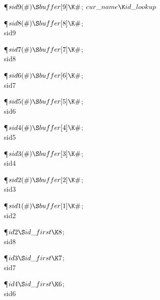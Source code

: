 \Y\P\D {}$\\{sid9}(\#)\S\\{buffer}[9]\K\#$;\5
$\\{cur\_name}\K\\{id\_lookup}$\par
\P\D {}$\\{sid8}(\#)\S\\{buffer}[8]\K\#$;\5
\\{sid9}\par
\P\D {}$\\{sid7}(\#)\S\\{buffer}[7]\K\#$;\5
\\{sid8}\par
\P\D {}$\\{sid6}(\#)\S\\{buffer}[6]\K\#$;\5
\\{sid7}\par
\P\D {}$\\{sid5}(\#)\S\\{buffer}[5]\K\#$;\5
\\{sid6}\par
\P\D {}$\\{sid4}(\#)\S\\{buffer}[4]\K\#$;\5
\\{sid5}\par
\P\D {}$\\{sid3}(\#)\S\\{buffer}[3]\K\#$;\5
\\{sid4}\par
\P\D {}$\\{sid2}(\#)\S\\{buffer}[2]\K\#$;\5
\\{sid3}\par
\P\D {}$\\{sid1}(\#)\S\\{buffer}[1]\K\#$;\5
\\{sid2}\par
\P\D {}$\\{id2}\S\\{id\_first}\K8$;\5
\\{sid8}\par
\P\D {}$\\{id3}\S\\{id\_first}\K7$;\5
\\{sid7}\par
\P\D {}$\\{id4}\S\\{id\_first}\K6$;\5
\\{sid6}\par
